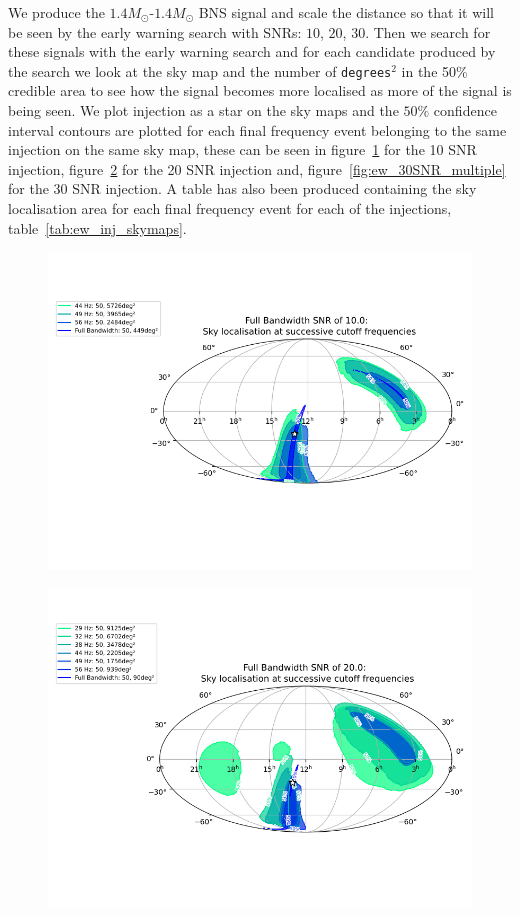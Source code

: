 We produce the $1.4M_\odot$-$1.4M_\odot$ BNS signal and scale the distance so that it will be seen by the early warning search with SNRs: $10$, $20$, $30$. Then we search for these signals with the early warning search and for each candidate produced by the search we look at the sky map and the number of \verb|degrees|$^2$ in the 50\% credible area to see how the signal becomes more localised as more of the signal is being seen. We plot injection as a star on the sky maps and the $50\%$ confidence interval contours are plotted for each final frequency event belonging to the same injection on the same sky map, these can be seen in figure~\ref{fig:ew_10SNR_multiple} for the 10 SNR injection, figure~\ref{fig:ew_20SNR_multiple} for the 20 SNR injection and, figure~\ref{fig:ew_30SNR_multiple} for the 30 SNR injection. A table has also been produced containing the sky localisation area for each final frequency event for each of the injections, table~\ref{tab:ew_inj_skymaps}.
%
\begin{figure}
    \centering
    \includegraphics[width=\textwidth]{images/6_earlywarning/localisation/10SNR_multiple.png}
    \caption{}
    \label{fig:ew_10SNR_multiple}
\end{figure}
%
\begin{figure}
    \centering
    \includegraphics[width=\textwidth]{images/6_earlywarning/localisation/20SNR_multiple.png}
    \caption{}
    \label{fig:ew_20SNR_multiple}
\end{figure}

